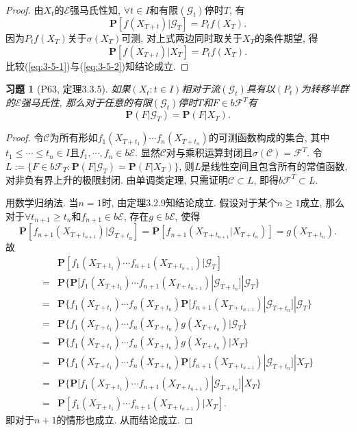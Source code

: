 \documentclass[UTF8,ondside]{ctexart}
\newtheorem{exercise}{习题}[section]
\newcommand{\h}{\mathscr}
\newcommand{\mbf}{\mathbf}
\numberwithin{equation}{section}
\begin{document}
	\begin{proof}
		由$X_t$的$\h E$强马氏性知, $\forall t\in I$和有限$(\h G_t)$停时$T$, 有
		\begin{equation}\label{eq:3-5-1}
			\mbf P[f(X_{T+t})|\h G_T]=P_t f(X_T).
		\end{equation}
		因为$P_t f(X_T)$关于$\sigma(X_T)$可测, 对上式两边同时取关于$X_T$的条件期望, 得
		\begin{equation}\label{eq:3-5-2}
			\mbf P[f(X_{T+t})|X_T]=P_t f(X_T).
		\end{equation}
		比较(\ref{eq:3-5-1})与(\ref{eq:3-5-2})知结论成立.
	\end{proof}
	\begin{exercise}[P63, 定理3.3.5]
		如果$(X_t:t\in I)$相对于流$(\h G_t)$具有以$(P_t)$为转移半群的$\h E$强马氏性, 那么对于任意的有限$(\h G_t)$停时$T$和$F\in b\h F^{T}$有
		\[
			\mbf P(F|\h G_T)=\mbf P(F|X_T).
		\]
	\end{exercise}
	\begin{proof}
		令$\h C$为所有形如$f_1(X_{T+t_1})\cdots f_n(X_{T+t_n})$的可测函数构成的集合, 其中$t_1\leq\cdots\leq t_n\in I$且$f_1,\cdots,f_n\in b\h E$. 显然$\h C$对与乘积运算封闭且$\sigma(\h C)=\h F^T$. 令$L:=\{F\in b\h F_T:\mbf P(F|\h G_T)=\mbf P(F|X_T)\}$, 则$L$是线性空间且包含所有的常值函数, 对非负有界上升的极限封闭. 由单调类定理, 只需证明$\h C\subset L$, 即得$b\h F^T\subset L$.

		用数学归纳法. 当$n=1$时, 由定理3.2.9知结论成立. 假设对于某个$n\geq 1$成立, 那么对于$\forall t_{n+1}\geq t_n$和$f_{n+1}\in b\h E$, 存在$g\in b\h E$, 使得
		\[
			\mbf P[f_{n+1}(X_{T+t_{n+1}})|\h G_{T+t_n}]=\mbf P[f_{n+1}(X_{T+t_{n+1}}|X_{T+t_n})]=g(X_{T+t_n}).
		\]
		故
		\[
			\begin{aligned}
				&\mbf P[f_1(X_{T+t_1})\cdots f_{n+1}(X_{T+t_{n+1}})|\h G_T]\\
				=&\mbf P\{\mbf P[f_1(X_{T+t_1})\cdots f_{n+1}(X_{T+t_{n+1}})|\h G_{T+t_n}]|\h G_T\}\\
				=&\mbf P\{f_1(X_{T+t_1})\cdots f_n(X_{T+t_{n}})\mbf P[f_{n+1}(X_{T+t_{n+1}})|\h G_{T+t_n}]|\h G_T\}\\
				=&\mbf P\{f_1(X_{T+t_1})\cdots f_n(X_{T+t_{n}})g(X_{T+t_n})|\h G_T\}\\
				=&\mbf P\{f_1(X_{T+t_1})\cdots f_n(X_{T+t_{n}})g(X_{T+t_n})|X_T\}\\
				=&\mbf P\{f_1(X_{T+t_1})\cdots f_n(X_{T+t_{n}})\mbf P[f_{n+1}(X_{T+t_{n+1}})|\h G_{T+t_n}]|X_T\}\\
				=&\mbf P\{\mbf P[f_1(X_{T+t_1})\cdots f_{n+1}(X_{T+t_{n+1}})|\h G_{T+t_n}]|X_T\}\\
				=&\mbf P[f_1(X_{T+t_1})\cdots f_{n+1}(X_{T+t_{n+1}})|X_T].
			\end{aligned}
		\]
		即对于$n+1$的情形也成立. 从而结论成立.
	\end{proof}
\end{document}
